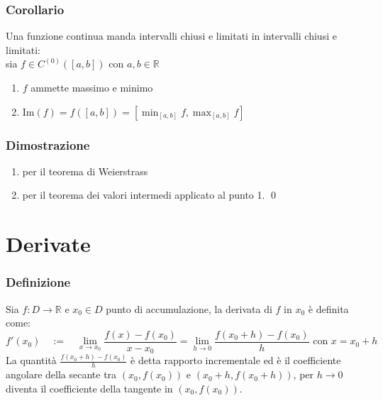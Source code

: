 \documentclass[a4paper]{article}
\newcommand\Img{\text{Im}}
\newcommand\cont[2]{C^{(#1)} \left({#2}\right)}
\begin{document}
\subsubsection*{Corollario}
Una funzione continua manda intervalli chiusi e limitati in intervalli chiusi e limitati: \\
sia \(f \in \cont{0}{\left[a, b\right]}\) con \(a, b \in \mathbb{R}\)
\begin{enumerate}
	\item \(f\) ammette massimo e minimo
	\item \(\displaystyle \Img(f) = f(\left[a, b\right]) = \left[\min_{\left[a, b\right]} f, \max_{\left[a, b\right]} f\right]\)
\end{enumerate}

\subsubsection*{Dimostrazione}
\begin{enumerate}
	\item per il teorema di Weierstrass
	\item per il teorema dei valori intermedi applicato al punto 1. \qed
\end{enumerate}

\newpage


\section{Derivate}
\subsubsection*{Definizione}
Sia \(f:D \to \mathbb{R}\) e \(x_0 \in D\) punto di accumulazione, la derivata di \(f\) in \(x_0\) è definita come:
\[f'(x_0) \quad := \quad \lim_{x \to x_0} \frac{f(x) - f(x_0)}{x - x_0} = \lim_{h \to 0} \frac{f(x_0 + h) - f(x_0)}{h} \text{ con } x = x_0 + h\]
La quantità \(\displaystyle \frac{f(x_0 + h) - f(x_0)}{h}\) è detta rapporto incrementale ed è il coefficiente angolare della secante tra
\(\left(x_0, f(x_0)\right)\) e \(\left(x_0 + h, f(x_0 + h)\right)\), per \(h \to 0\) diventa il coefficiente della tangente in \(\left(x_0, f(x_0)\right)\).
\end{document}
